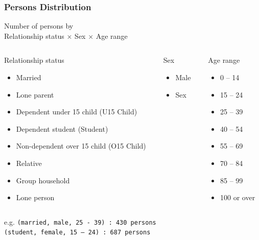 \begin{frame} \frametitle{Persons Distribution} \begin{center} {\large Number
        of persons by\\ Relationship status $\times$ Sex $\times$ Age range}
    \end{center} \begin{columns}[T] %
    \begin{column}{.3\textwidth} Relationship status \begin{itemize} \item
        Married \item Lone parent \item Dependent under 15 child (U15 Child) 
        \item
        Dependent student (Student) \item Non-dependent over 15 child (O15 
        Child)
        \item Relative \item Group household \item Lone person \end{itemize}
    \end{column}%
    \hfill%
    \begin{column}{.3\textwidth} Sex \begin{itemize} \item Male \item Sex
      \end{itemize} \end{column}%
      \hfill%
      \begin{column}{.3\textwidth} Age range \begin{itemize} \item 0 -- 14
          \item 15 -- 24 \item 25 -- 39 \item 40 -- 54 \item 55 -- 69 \item 70 
          --
          84 \item 85 -- 99 \item 100 or over \end{itemize} \end{column}%
    \end{columns} e.g. \texttt{(married, male, 25 - 39) : 430 persons}\\
    \hspace{2em}\texttt{(student, female, 15 -- 24) : 687 persons}\\
\end{frame}
  
